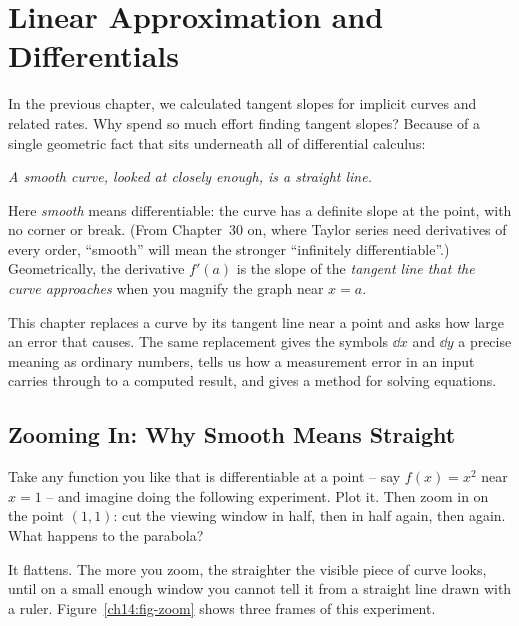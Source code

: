 \chapter{Linear Approximation and Differentials}

In the previous chapter, we calculated tangent slopes for implicit curves
and related rates. Why spend so much effort finding tangent slopes? Because of
a single geometric fact that sits underneath all of differential calculus:

\begin{center}
\emph{A smooth curve, looked at closely enough, is a straight line.}
\end{center}

Here \emph{smooth} means differentiable: the curve has a definite slope at the
point, with no corner or break. (From Chapter~30 on, where Taylor series need
derivatives of every order, ``smooth'' will mean the stronger ``infinitely differentiable''.) Geometrically, the derivative $f'(a)$ is the slope
of the \emph{tangent line that the curve approaches} when you magnify the graph
near $x=a$.

This chapter replaces a curve by its tangent line near a point and asks how large
an error that causes. The same replacement gives the symbols $\dd x$ and $\dd y$ a
precise meaning as ordinary numbers, tells us how a measurement error in an input
carries through to a computed result, and gives a method for solving equations.

\chapterline

\section{Zooming In: Why Smooth Means Straight}
\label{ch14:zooming}

Take any function you like that is differentiable at a point -- say
$f(x)=x^2$ near $x=1$ -- and imagine doing the following experiment. Plot it.
Then zoom in on the point $(1,1)$: cut the viewing window in half, then in half
again, then again. What happens to the parabola?

It flattens. The more you zoom, the straighter the visible piece of curve looks,
until on a small enough window you cannot tell it from a straight line
drawn with a ruler. Figure~\ref{ch14:fig-zoom} shows three frames of this
experiment.

